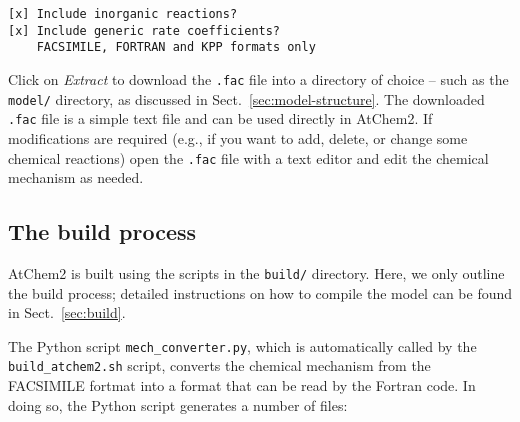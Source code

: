 \begin{verbatim}
[x] Include inorganic reactions?
[x] Include generic rate coefficients?
    FACSIMILE, FORTRAN and KPP formats only
\end{verbatim}

Click on \emph{Extract} to download the \texttt{.fac} file into a
directory of choice -- such as the \texttt{model/} directory, as
discussed in Sect.~\ref{sec:model-structure}. The downloaded
\texttt{.fac} file is a simple text file and can be used directly in
AtChem2. If modifications are required (e.g., if you want to add,
delete, or change some chemical reactions) open the \texttt{.fac} file
with a text editor and edit the chemical mechanism as needed.

\subsection{The build process} \label{subsec:build-process}

AtChem2 is built using the scripts in the \texttt{build/}
directory. Here, we only outline the build process; detailed
instructions on how to compile the model can be found in
Sect.~\ref{sec:build}.

The Python script \texttt{mech\_converter.py}, which is automatically
called by the \texttt{build\_atchem2.sh} script, converts the chemical
mechanism from the FACSIMILE fortmat into a format that can be read by
the Fortran code. In doing so, the Python script generates a number of
files:

